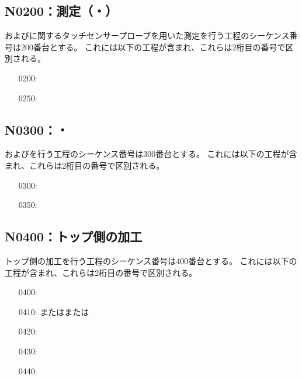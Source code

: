 \subsection{N0200：測定（\Dimple・\ReliefGroove）}
\Dimple および\ReliefGroove に関するタッチセンサープローブを用いた測定を行う工程のシーケンス番号は200番台とする。
これには以下の工程が含まれ、これらは2桁目の番号で区別される。
\begin{enumerate}
\item[0200:] \DimpleMeasurement
\item[0250:] \ReliefGrooveMeasurement
\end{enumerate}


\subsection{N0300：\DimpleMilling ・\ReliefGrooveMilling}
\DimpleMilling および\ReliefGrooveMilling を行う工程のシーケンス番号は300番台とする。
これには以下の工程が含まれ、これらは2桁目の番号で区別される。
\begin{enumerate}
\item[0300:] \DimpleMilling
\item[0350:] \ReliefGrooveMilling
\end{enumerate}


\subsection{N0400：トップ側の加工}
トップ側の加工を行う工程のシーケンス番号は400番台とする。
これには以下の工程が含まれ、これらは2桁目の番号で区別される。
\begin{enumerate}
\item[0400:] \TopEndFacecutMilling
\item[0410:] \TopOutcutMilling または\EndFaceBoringMilling または\IncutBoringMilling
\item[0420:] \KeywayMilling
\item[0430:] \TopEndFaceOutCChamferMilling
\item[0440:] \TopEndFaceInCChamferMilling
\end{enumerate}



